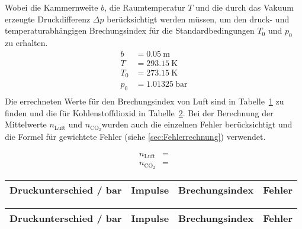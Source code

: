 Wobei die Kammernweite $b$, die Raumtemperatur $T$ und die durch das Vakuum erzeugte Druckdifferenz $\Delta p$ berücksichtigt werden müssen, um den druck- und temperaturabhängigen Brechungsindex für die Standardbedingungen $T_0$ und $p_0$ zu erhalten.
\begin{align*}
	b &= \SI{0.05}{\meter} \\
	T &= \SI{293.15}{\kelvin} \\
	T_0 &= \SI {273.15}{\kelvin} \\
	p_0 &= \SI{1.01325}{\bar} \\
\end{align*}
Die errechneten Werte für den Brechungsindex von Luft sind in Tabelle~\ref{tab:BrechungsindexLuft} zu finden und die für Kohlenstoffdioxid in Tabelle~\ref{tab:BrechungsindexCO2}.
Bei der Berechnung der Mittelwerte $n_\text{Luft}$ und $n_\text{CO$_2$}$wurden auch die einzelnen Fehler berücksichtigt und die Formel für gewichtete Fehler (siehe \ref{sec:Fehlerrechnung})  verwendet.

\begin{align}
	n_\text{Luft} &= \\
	n_\text{CO$_2$} &= 
\end{align}

\begin{table}[h!]
	\centering	
	\begin{tabular}{cccc}
		Druckunterschied / \si{\bar} & Impulse & Brechungsindex & Fehler \\
		\hline
		
	\end{tabular}
	\label{tab:BrechungsindexLuft}
\end{table}


\begin{table}[h!]
	\centering
	\begin{tabular}{cccc}
		Druckunterschied / \si{\bar} & Impulse & Brechungsindex   & Fehler \\
		\hline
		
	\end{tabular}
	\label{tab:BrechungsindexCO2}
\end{table}

















